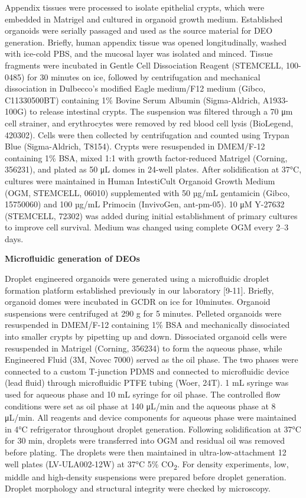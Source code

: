 \documentclass[
]{article}
\begin{document}
Appendix tissues were processed to isolate epithelial crypts, which were embedded in Matrigel and cultured in organoid growth medium. Established organoids were serially passaged and used as the source material for DEO generation. Briefly, human appendix tissue was opened longitudinally, washed with ice-cold PBS, and the mucosal layer was isolated and minced. Tissue fragments were incubated in Gentle Cell Dissociation Reagent (STEMCELL, 100-0485) for 30 minutes on ice, followed by centrifugation and mechanical dissociation in Dulbecco's modified Eagle medium/F12 medium (Gibco, C11330500BT) containing 1\% Bovine Serum Albumin (Sigma-Aldrich, A1933-100G) to release intestinal crypts. The suspension was filtered through a 70 μm cell strainer, and erythrocytes were removed by red blood cell lysis (BioLegend, 420302). Cells were then collected by centrifugation and counted using Trypan Blue (Sigma-Aldrich, T8154). Crypts were resuspended in DMEM/F-12 containing 1\% BSA, mixed 1:1 with growth factor-reduced Matrigel (Corning, 356231), and plated as 50 μL domes in 24-well plates. After solidification at 37°C, cultures were maintained in Human IntestiCult Organoid Growth Medium (OGM, STEMCELL, 06010) supplemented with 50 µg/mL gentamicin (Gibco, 15750060) and 100 µg/mL Primocin (InvivoGen, ant-pm-05). 10 μM Y-27632 (STEMCELL, 72302) was added during initial establishment of primary cultures to improve cell survival. Medium was changed using complete OGM every 2--3 days.

\textbf{Microfluidic generation of DEOs}

Droplet engineered organoids were generated using a microfluidic droplet formation platform established previously in our laboratory {[}9-11{]}. Briefly, organoid domes were incubated in GCDR on ice for 10minutes. Organoid suspensions were centrifuged at 290 g for 5 minutes. Pelleted organoids were resuspended in DMEM/F-12 containing 1\% BSA and mechanically dissociated into smaller crypts by pipetting up and down. Dissociated organoid cells were resuspended in Matrigel (Corning, 356234) to form the aqueous phase, while Engineered Fluid (3M, Novec 7000) served as the oil phase. The two phases were connected to a custom T-junction PDMS and connected to microfluidic device (lead fluid) through microfluidic PTFE tubing (Woer, 24T). 1 mL syringe was used for aqueous phase and 10 mL syringe for oil phase. The controlled flow conditions were set as oil phase at 140 μL/min and the aqueous phase at 8 μL/min. All reagents and device components for aqueous phase were maintained in 4°C refrigerator throughout droplet generation. Following solidification at 37°C for 30 min, droplets were transferred into OGM and residual oil was removed before plating. The droplets were then maintained in ultra-low-attachment 12 well plates (LV-ULA002-12W) at 37°C 5\% CO\textsubscript{2}. For density experiments, low, middle and high-density suspensions were prepared before droplet generation. Droplet morphology and structural integrity were checked by microscopy.
\end{document}

